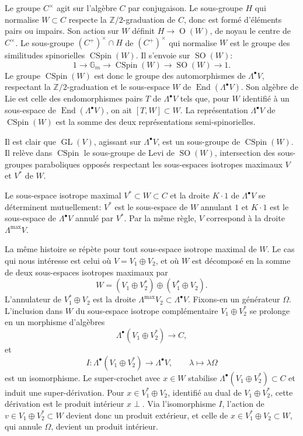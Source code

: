 \documentclass[11pt]{article}
\newcommand{\Z}{\mathbb Z}
\newcommand{\Gm}{\mathbb G_m}
\newcommand{\End}{\operatorname{End}}
\newcommand{\GL}{\operatorname{GL}}
\newcommand{\SO}{\operatorname{SO}}
\newcommand{\OO}{\operatorname{O}}
\newcommand{\CSpin}{\operatorname{CSpin}}
\theoremstyle{deligne}
\begin{document}
Le groupe $C^\times$ agit sur l'algèbre $C$ par conjugaison. Le sous-groupe $H$ qui normalise $W\subset C$ respecte la $\Z/2$-graduation de $C$, donc est formé d'éléments pairs ou impairs. Son action sur $W$ définit $H\to\OO(W)$, de noyau le centre de $C^\times$. Le sous-groupe $(C^+)^\times\cap H$ de $(C^+)^\times$ qui normalise $W$ est le groupe des similitudes spinorielles $\CSpin(W)$. Il s'envoie sur $\SO(W)$:
\[
1\longrightarrow\Gm\longrightarrow\CSpin(W)\longrightarrow\SO(W)\longrightarrow1.
\]
Le groupe $\CSpin(W)$ est donc le groupe des automorphismes de $\Lambda^\bullet V$, respectant la $\Z/2$-graduation et le sous-espace $W$ de $\End(\Lambda^\bullet V)$. Son algèbre de Lie est celle des endomorphismes pairs $T$ de $\Lambda^\bullet V$ tels que, pour $W$ identifié à un sous-espace de $\End(\Lambda^\bullet V)$, on ait $[T,W]\subset W$. La représentation $\Lambda^\bullet V$ de $\CSpin(W)$ est la somme des deux représentations semi-spinorielles.

Il est clair que $\GL(V)$, agissant sur $\Lambda^\bullet V$, est un sous-groupe de $\CSpin(W)$. Il relève dans $\CSpin$ le sous-groupe de Levi de $\SO(W)$, intersection des sous-groupes paraboliques opposés respectant les sous-espaces isotropes maximaux $V$ et $V^*$ de $W$.

Le sous-espace isotrope maximal $V^*\subset W\subset C$ et la droite $K\cdot1$ de $\Lambda^\bullet V$ se déterminent mutuellement: $V^*$ est le sous-espace de $W$ annulant $1$ et $K\cdot1$ est le sous-espace de $\Lambda^\bullet V$ annulé par $V^*$. Par la même règle, $V$ correspond à la droite $\Lambda^{\max}V$.

La même histoire se répète pour tout sous-espace isotrope maximal de $W$. Le cas qui nous intéresse est celui où $V=V_1\oplus V_2$, et où $W$ est décomposé en la somme de deux sous-espaces isotropes maximaux par
\[
W=(V_1\oplus V_2^*)\oplus(V_1^*\oplus V_2).
\]
L'annulateur de $V_1^*\oplus V_2$ est la droite $\Lambda^{\max}V_2\subset\Lambda^\bullet V$. Fixons-en un générateur $\Omega$. L'inclusion dans $W$ du sous-espace isotrope complémentaire $V_1\oplus V_2^*$ se prolonge en un morphisme d'algèbres
\[
\Lambda^\bullet(V_1\oplus V_2^*)\longrightarrow C,
\]
et
\begin{equation}\tag{3.3}
I:\Lambda^\bullet(V_1\oplus V_2^*)\longrightarrow\Lambda^\bullet V,
\qquad \lambda\longmapsto \lambda\Omega
\end{equation}
est un isomorphisme. Le super-crochet avec $x\in W$ stabilise $\Lambda^\bullet(V_1\oplus V_2^*)\subset C$ et induit une super-dérivation. Pour $x\in V_1^*\oplus V_2$, identifié au dual de $V_1\oplus V_2^*$, cette dérivation est le produit intérieur $x\perp$. Via l'isomorphisme $I$, l'action de $v\in V_1\oplus V_2^*\subset W$ devient donc un produit extérieur, et celle de $x\in V_1^*\oplus V_2\subset W$, qui annule $\Omega$, devient un produit intérieur.
\end{document}
